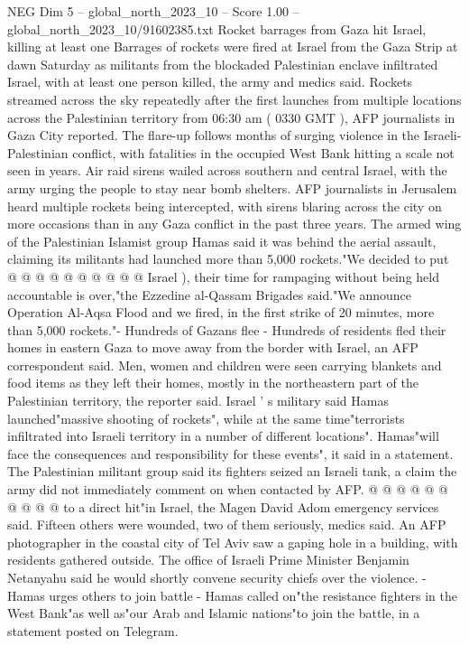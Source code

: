 \begin{textsample}{NEG Dim 5 – global\_north\_2023\_10 – Score 1.00 – global\_north\_2023\_10/91602385.txt}  \label{ex:f5_neg_025}
Rocket barrages from Gaza hit Israel, killing at least one Barrages of rockets were fired at Israel from the Gaza Strip at dawn Saturday as militants from the blockaded Palestinian enclave infiltrated Israel, with at least one person killed, the army and medics said.
Rockets streamed across the sky repeatedly after the first launches from multiple locations across the Palestinian territory from 06:30 am ( 0330 GMT ), AFP journalists in Gaza City reported.
The flare-up follows months of surging violence in the Israeli-Palestinian conflict, with fatalities in the occupied West Bank hitting a scale not seen in years.
Air raid sirens wailed across southern and central Israel, with the army urging the people to stay near bomb shelters.
AFP journalists in Jerusalem heard multiple rockets being intercepted, with sirens blaring across the city on more occasions than in any Gaza conflict in the past three years.
The armed wing of the Palestinian Islamist group Hamas said it was behind the aerial assault, claiming its militants had launched more than 5,000 rockets."We decided to put @ @ @ @ @ @ @ @ @ @ Israel ), their time for rampaging without being held accountable is over,"the Ezzedine al-Qassam Brigades said."We announce Operation Al-Aqsa Flood and we fired, in the first strike of 20 minutes, more than 5,000 rockets."- Hundreds of Gazans flee - Hundreds of residents fled their homes in eastern Gaza to move away from the border with Israel, an AFP correspondent said.
Men, women and children were seen carrying blankets and food items as they left their homes, mostly in the northeastern part of the Palestinian territory, the reporter said.
Israel ' s military said Hamas launched"massive shooting of rockets", while at the same time"terrorists infiltrated into Israeli territory in a number of different locations".
Hamas"will face the consequences and responsibility for these events", it said in a statement.
The Palestinian militant group said its fighters seized an Israeli tank, a claim the army did not immediately comment on when contacted by AFP. @ @ @ @ @ @ @ @ @ @ to a direct hit"in Israel, the Magen David Adom emergency services said.
Fifteen others were wounded, two of them seriously, medics said.
An AFP photographer in the coastal city of Tel Aviv saw a gaping hole in a building, with residents gathered outside.
The office of Israeli Prime Minister Benjamin Netanyahu said he would shortly convene security chiefs over the violence. - Hamas urges others to join battle - Hamas called on"the resistance fighters in the West Bank"as well as"our Arab and Islamic nations"to join the battle, in a statement posted on Telegram.

\end{textsample}

